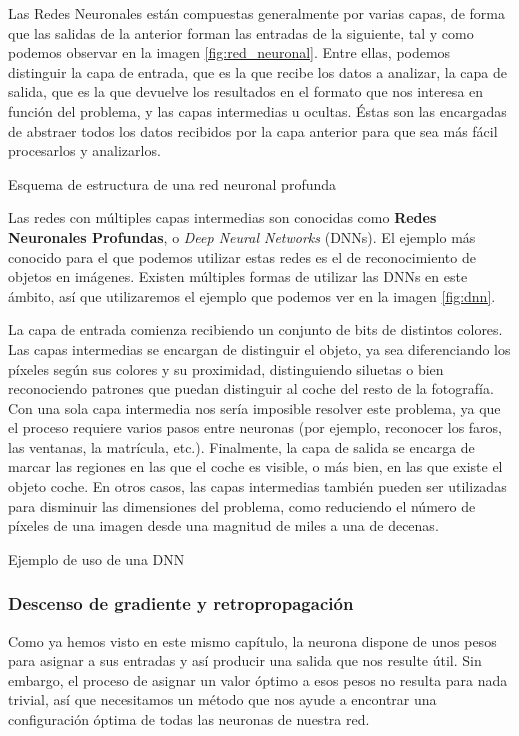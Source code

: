 Las Redes Neuronales están compuestas generalmente por varias capas, de forma que las salidas de la anterior forman las entradas de la siguiente, tal y como podemos observar en la imagen \ref{fig:red_neuronal}. Entre ellas, podemos distinguir la capa de entrada, que es la que recibe los datos a analizar, la capa de salida, que es la que devuelve los resultados en el formato que nos interesa en función del problema, y las capas intermedias u ocultas. Éstas son las encargadas de abstraer todos los datos recibidos por la capa anterior para que sea más fácil procesarlos y analizarlos. 

%
       {Esquema de estructura de una red neuronal profunda}

Las redes con múltiples capas intermedias son conocidas como \textbf{Redes Neuronales Profundas}, o \textit{Deep Neural Networks} (DNNs). El ejemplo más conocido para el que podemos utilizar estas redes es el de reconocimiento de objetos en imágenes. Existen múltiples formas de utilizar las DNNs en este ámbito, así que utilizaremos el ejemplo que podemos ver en la imagen \ref{fig:dnn}. 

La capa de entrada comienza recibiendo un conjunto de bits de distintos colores. Las capas intermedias se encargan de distinguir el objeto, ya sea diferenciando los píxeles según sus colores y su proximidad, distinguiendo siluetas o bien reconociendo patrones que puedan distinguir al coche del resto de la fotografía. Con una sola capa intermedia nos sería imposible resolver este problema, ya que el proceso requiere varios pasos entre neuronas (por ejemplo, reconocer los faros, las ventanas, la matrícula, etc.). Finalmente, la capa de salida se encarga de marcar las regiones en las que el coche es visible, o más bien, en las que existe el objeto coche. En otros casos, las capas intermedias también pueden ser utilizadas para disminuir las dimensiones del problema, como reduciendo el número de píxeles de una imagen desde una magnitud de miles a una de decenas.

%
       {Ejemplo de uso de una DNN \citep{NIPS2013_5207}}    

\subsubsection{Descenso de gradiente y retropropagación}

Como ya hemos visto en este mismo capítulo, la neurona dispone de unos pesos para asignar a sus entradas y así producir una salida que nos resulte útil. Sin embargo, el proceso de asignar un valor óptimo a esos pesos no resulta para nada trivial, así que necesitamos un método que nos ayude a encontrar una configuración óptima de todas las neuronas de nuestra red.
 

